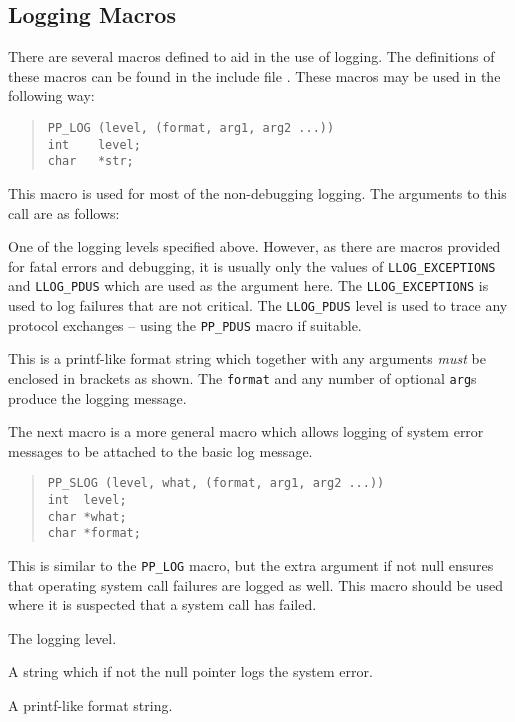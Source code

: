 \subsection	{Logging Macros}\label{logging}
There are several macros defined to aid in the use of logging. The
definitions of these macros can be found in the include file
. These macros may be used in the following way:
\begin{quote}\begin{verbatim}
PP_LOG (level, (format, arg1, arg2 ...))
int    level;
char   *str;
\end{verbatim}\end{quote}
This macro is used for most of the non-debugging logging. The
arguments to this call are as follows:
\begin{describe}
\item[\verb|level|:]	One of the logging levels specified above.
However, as there are macros provided for fatal errors and debugging,
it is usually only the values of 
\linebreak
\verb|LLOG_EXCEPTIONS| and
\verb|LLOG_PDUS| which are used as the argument here. The
\verb|LLOG_EXCEPTIONS| is used to log failures that are not critical.
The \verb|LLOG_PDUS| level is used to trace any protocol exchanges --
using the
\verb|PP_PDUS| macro if suitable.

\item[\verb|format|:]	This is a printf-like format string which
together with any arguments {\em must} be enclosed in brackets as
shown. The
\verb|format| and any number of optional \verb|arg|s produce the
logging message.
\end{describe}

The next macro is a more general macro which allows logging of system
error messages to be attached to the basic log message.

\begin{quote}\begin{verbatim}
PP_SLOG (level, what, (format, arg1, arg2 ...))
int  level;
char *what;
char *format;
\end{verbatim}\end{quote}
This is similar to the \verb|PP_LOG| macro, but the extra argument if
not null ensures that operating system call failures are logged as
well. This macro should be used where it is suspected that a system
call has failed.
\begin{describe}
\item[\verb|level|:]	The logging level.
\item[\verb|what|:]	A string which if not the null pointer logs
the system error.
\item[\verb|format|:]	A printf-like format string.
\end{describe}

